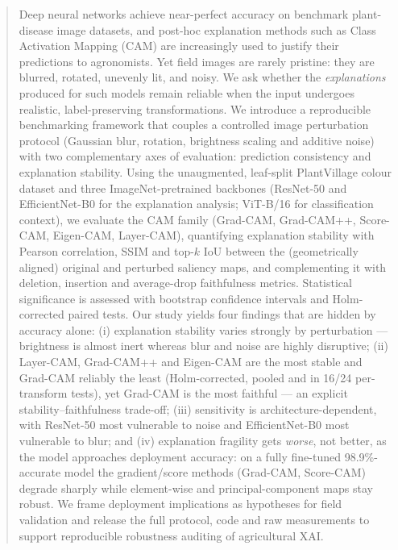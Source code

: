\documentclass[runningheads]{llncs}
\begin{document}
\begin{abstract}
Deep neural networks achieve near-perfect accuracy on benchmark plant-disease
image datasets, and post-hoc explanation methods such as Class Activation
Mapping (CAM) are increasingly used to justify their predictions to agronomists.
Yet field images are rarely pristine: they are blurred, rotated, unevenly lit,
and noisy. We ask whether the \emph{explanations} produced for such models remain
reliable when the input undergoes realistic, label-preserving transformations. We
introduce a reproducible benchmarking framework that couples a controlled image
perturbation protocol (Gaussian blur, rotation, brightness scaling and additive
noise) with two complementary axes of evaluation: prediction consistency and
explanation stability. Using the unaugmented, leaf-split PlantVillage colour
dataset and three ImageNet-pretrained backbones (ResNet-50 and EfficientNet-B0 for
the explanation analysis; ViT-B/16 for classification context), we evaluate the
CAM family (Grad-CAM, Grad-CAM++, Score-CAM, Eigen-CAM, Layer-CAM), quantifying
explanation stability with Pearson correlation, SSIM and top-$k$ IoU between the
(geometrically aligned) original and perturbed saliency maps, and complementing it
with deletion, insertion and average-drop faithfulness metrics. Statistical
significance is assessed with bootstrap confidence intervals and Holm-corrected
paired tests. Our study yields four findings that are hidden by accuracy alone:
(i) explanation stability varies strongly by perturbation --- brightness is almost
inert whereas blur and noise are highly disruptive; (ii) Layer-CAM,
Grad-CAM++ and Eigen-CAM are the most stable and Grad-CAM reliably the least
(Holm-corrected, pooled and in 16/24 per-transform tests), yet Grad-CAM is the most
faithful --- an explicit stability--faithfulness trade-off; (iii) sensitivity is
architecture-dependent, with ResNet-50 most vulnerable to noise and
EfficientNet-B0 most vulnerable to blur; and (iv) explanation fragility gets
\emph{worse}, not better, as the model approaches deployment accuracy: on a fully
fine-tuned 98.9\%-accurate model the gradient/score methods (Grad-CAM, Score-CAM)
degrade sharply while element-wise and principal-component maps stay robust. We frame deployment implications as
hypotheses for field validation and release the full protocol, code and raw
measurements to support reproducible robustness auditing of agricultural XAI.
\end{abstract}
\end{document}
